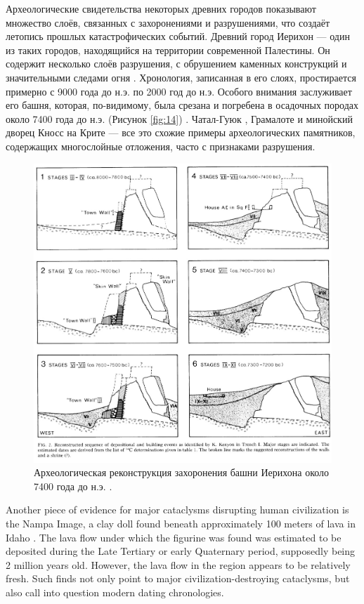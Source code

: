 \documentclass[10pt,twocolumn,letterpaper]{article}
\begin{document}
Археологические свидетельства некоторых древних городов показывают множество слоёв, связанных с захоронениями и разрушениями, что создаёт летопись прошлых катастрофических событий. Древний город Иерихон — один из таких городов, находящийся на территории современной Палестины. Он содержит несколько слоёв разрушения, с обрушением каменных конструкций и значительными следами огня \cite{96,97}. Хронология, записанная в его слоях, простирается примерно с 9000 года до н.э. по 2000 год до н.э. Особого внимания заслуживает его башня, которая, по-видимому, была срезана и погребена в осадочных породах около 7400 года до н.э. (Рисунок \ref{fig:14}) \cite{95}. Чатал-Гуюк \cite{99}, Грамалоте \cite{98} и минойский дворец Кносс на Крите \cite{100,101} — все это схожие примеры археологических памятников, содержащих многослойные отложения, часто с признаками разрушения.

\begin{figure}[t]
\begin{center}
   \includegraphics[width=1\linewidth]{jericho.jpg}
\end{center}
   \caption{Археологическая реконструкция захоронения башни Иерихона около 7400 года до н.э. \cite{95}.}
\label{fig:14}
\label{fig:onecol}
\end{figure}
Another piece of evidence for major cataclysms disrupting human civilization is the Nampa Image, a clay doll found beneath approximately 100 meters of lava in Idaho \cite{102,103}. The lava flow under which the figurine was found was estimated to be deposited during the Late Tertiary or early Quaternary period, supposedly being 2 million years old. However, the lava flow in the region appears to be relatively fresh. Such finds not only point to major civilization-destroying cataclysms, but also call into question modern dating chronologies.
\end{document}
